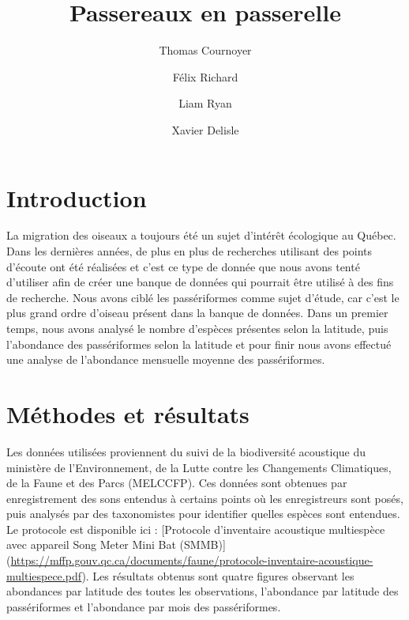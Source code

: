 \documentclass[9pt,twocolumn,twoside,]{pnas-new}
\title{Passereaux en passerelle}
\author[]{Thomas Cournoyer}
\author[]{Félix Richard}
\author[]{Liam Ryan}
\author[]{Xavier Delisle}
\affil[]{Université de Sherbrooke, Cours BIO500}
\begin{document}
\verticaladjustment{-2pt}



\maketitle
\thispagestyle{firststyle}


\acknow{}

\hypertarget{introduction}{%
\section*{Introduction}\label{introduction}}

La migration des oiseaux a toujours été un sujet d'intérêt écologique au
Québec. Dans les dernières années, de plus en plus de recherches
utilisant des points d'écoute ont été réalisées et c'est ce type de
donnée que nous avons tenté d'utiliser afin de créer une banque de
données qui pourrait être utilisé à des fins de recherche. Nous avons
ciblé les passériformes comme sujet d'étude, car c'est le plus grand
ordre d'oiseau présent dans la banque de données. Dans un premier temps,
nous avons analysé le nombre d'espèces présentes selon la latitude, puis
l'abondance des passériformes selon la latitude et pour finir nous avons
effectué une analyse de l'abondance mensuelle moyenne des passériformes.

\hypertarget{muxe9thodes-et-ruxe9sultats}{%
\section*{Méthodes et résultats}\label{muxe9thodes-et-ruxe9sultats}}

Les données utilisées proviennent du suivi de la biodiversité acoustique
du ministère de l'Environnement, de la Lutte contre les Changements
Climatiques, de la Faune et des Parcs (MELCCFP). Ces données sont
obtenues par enregistrement des sons entendus à certains points où les
enregistreurs sont posés, puis analysés par des taxonomistes pour
identifier quelles espèces sont entendues. Le protocole est disponible
ici : {[}Protocole d'inventaire acoustique multiespèce avec appareil
Song Meter Mini Bat (SMMB){]}
(\url{https://mffp.gouv.qc.ca/documents/faune/protocole-inventaire-acoustique-multiespece.pdf}).
Les résultats obtenus sont quatre figures observant les abondances par
latitude des toutes les observations, l'abondance par latitude des
passériformes et l'abondance par mois des passériformes.
\end{document}

